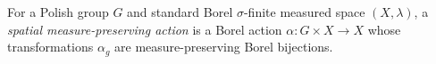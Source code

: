 
For a Polish group $G$ and standard Borel $\sigma$-finite measured space $(X,\lambda)$, a \emph{spatial measure-preserving action} is a Borel action $\alpha:G\times X\to X$ whose transformations $\alpha_g$ are measure-preserving Borel bijections.
